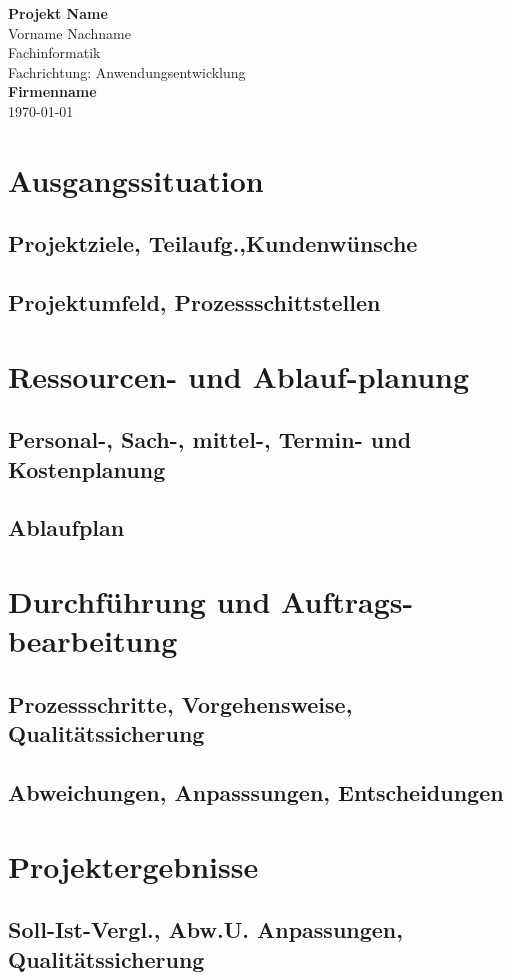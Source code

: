 \documentclass[10pt,a4paper,appendixprefix,liststotoc]{scrreprt}
\begin{document}
\begin{titlepage}
 \begin{center}
	\huge
	\textbf{Projekt Name}
	\bigskip\\
	\large
	Vorname Nachname \\
	Fachinformatik\\
	Fachrichtung: Anwendungsentwicklung
	\bigskip\\
   \textbf{Firmenname}
	\bigskip\\
	\today
\end{center}
\end{titlepage}
\newpage
{}
\tableofcontents
\newpage
{}
\chapter{Ausgangssituation}
\section{Projektziele, Teilaufg.,Kundenw\"unsche }
\section{Projektumfeld, Prozessschittstellen}
\chapter{Ressourcen- und Ablauf-planung}
\section{Personal-, Sach-, mittel-, Termin- und Kostenplanung}
\section{Ablaufplan}
\chapter{Durchführung und Auftrags-bearbeitung}
\section{Prozessschritte, Vorgehensweise, Qualit\"atssicherung}
\section{Abweichungen, Anpasssungen, Entscheidungen}
\chapter{Projektergebnisse}
\section{Soll-Ist-Vergl., Abw.U. Anpassungen, Qualit\"atssicherung}

\newpage
{}
\appendix
	\listoftables
	\listoffiguresss
\end{document}
